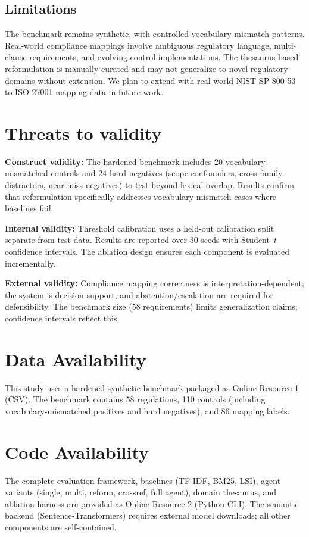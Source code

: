 \documentclass{sn-jnl}
\begin{document}
\subsection{Limitations}
The benchmark remains synthetic, with controlled vocabulary mismatch patterns.
Real-world compliance mappings involve ambiguous regulatory language, multi-clause requirements, and evolving control implementations.
The thesaurus-based reformulation is manually curated and may not generalize to novel regulatory domains without extension.
We plan to extend with real-world NIST SP 800-53 to ISO 27001 mapping data in future work.

\section{Threats to validity}

\textbf{Construct validity:} The hardened benchmark includes 20 vocabulary-mismatched controls and 24 hard negatives (scope confounders, cross-family distractors, near-miss negatives) to test beyond lexical overlap.
Results confirm that reformulation specifically addresses vocabulary mismatch cases where baselines fail.

\textbf{Internal validity:} Threshold calibration uses a held-out calibration split separate from test data.
Results are reported over 30 seeds with Student~$t$ confidence intervals.
The ablation design ensures each component is evaluated incrementally.

\textbf{External validity:} Compliance mapping correctness is interpretation-dependent; the system is decision support, and abstention/escalation are required for defensibility.
The benchmark size (58 requirements) limits generalization claims; confidence intervals reflect this.

\section*{Data Availability}
This study uses a hardened synthetic benchmark packaged as Online Resource 1 (CSV).
The benchmark contains 58 regulations, 110 controls (including vocabulary-mismatched positives and hard negatives), and 86 mapping labels.

\section*{Code Availability}
The complete evaluation framework, baselines (TF-IDF, BM25, LSI), agent variants (single, multi, reform, crossref, full agent), domain thesaurus, and ablation harness are provided as Online Resource 2 (Python CLI).
The semantic backend (Sentence-Transformers) requires external model downloads; all other components are self-contained.
\end{document}
